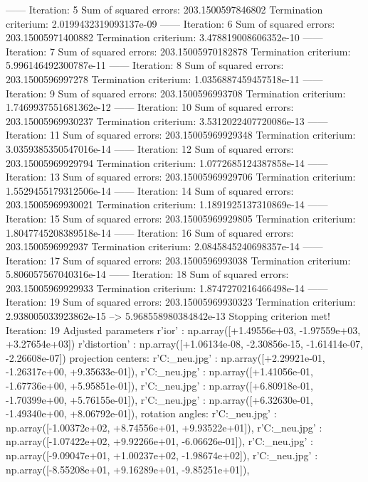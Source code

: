------ Iteration: 5
Sum of squared errors: 203.1500597846802
Termination criterium: 2.0199432319093137e-09
------ Iteration: 6
Sum of squared errors: 203.15005971400882
Termination criterium: 3.478819008606352e-10
------ Iteration: 7
Sum of squared errors: 203.15005970182878
Termination criterium: 5.996146492300787e-11
------ Iteration: 8
Sum of squared errors: 203.1500596997278
Termination criterium: 1.0356887459457518e-11
------ Iteration: 9
Sum of squared errors: 203.1500596993708
Termination criterium: 1.7469937551681362e-12
------ Iteration: 10
Sum of squared errors: 203.15005969930237
Termination criterium: 3.5312022407720086e-13
------ Iteration: 11
Sum of squared errors: 203.15005969929348
Termination criterium: 3.0359385350547016e-14
------ Iteration: 12
Sum of squared errors: 203.15005969929794
Termination criterium: 1.0772685124387858e-14
------ Iteration: 13
Sum of squared errors: 203.15005969929706
Termination criterium: 1.5529455179312506e-14
------ Iteration: 14
Sum of squared errors: 203.15005969930021
Termination criterium: 1.1891925137310869e-14
------ Iteration: 15
Sum of squared errors: 203.15005969929805
Termination criterium: 1.8047745208389518e-14
------ Iteration: 16
Sum of squared errors: 203.1500596992937
Termination criterium: 2.0845845240698357e-14
------ Iteration: 17
Sum of squared errors: 203.1500596993038
Termination criterium: 5.806057567040316e-14
------ Iteration: 18
Sum of squared errors: 203.15005969929933
Termination criterium: 1.8747270216466498e-14
------ Iteration: 19
Sum of squared errors: 203.15005969930323
Termination criterium: 2.938005033923862e-15
-->
5.968558980384842e-13
Stopping criterion met! Iteration: 19
Adjusted parameters
r'ior' : np.array([+1.49556e+03, -1.97559e+03, +3.27654e+03])
r'distortion' : np.array([+1.06134e-08, -2.30856e-15, -1.61414e-07, -2.26608e-07])
projection centers:
r'C:\Users\Clemens\Desktop\fotos_neu\1.jpg' : np.array([+2.29921e-01, -1.26317e+00, +9.35633e-01]),
r'C:\Users\Clemens\Desktop\fotos_neu\2.jpg' : np.array([+1.41056e-01, -1.67736e+00, +5.95851e-01]),
r'C:\Users\Clemens\Desktop\fotos_neu\3.jpg' : np.array([+6.80918e-01, -1.70399e+00, +5.76155e-01]),
r'C:\Users\Clemens\Desktop\fotos_neu\4.jpg' : np.array([+6.32630e-01, -1.49340e+00, +8.06792e-01]),
rotation angles:
r'C:\Users\Clemens\Desktop\fotos_neu\1.jpg' : np.array([-1.00372e+02, +8.74556e+01, +9.93522e+01]),
r'C:\Users\Clemens\Desktop\fotos_neu\2.jpg' : np.array([-1.07422e+02, +9.92266e+01, -6.06626e-01]),
r'C:\Users\Clemens\Desktop\fotos_neu\3.jpg' : np.array([-9.09047e+01, +1.00237e+02, -1.98674e+02]),
r'C:\Users\Clemens\Desktop\fotos_neu\4.jpg' : np.array([-8.55208e+01, +9.16289e+01, -9.85251e+01]),
